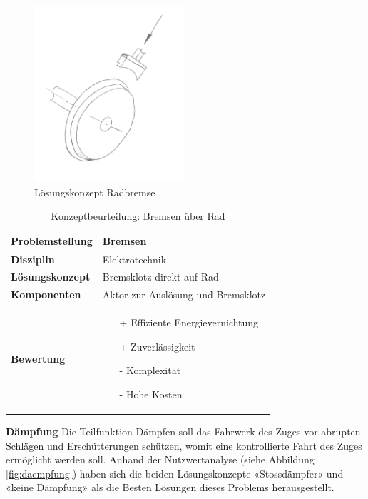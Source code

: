 \documentclass[../../../main.tex]{subfiles}
\begin{document}
    \begin{figure}[H] %
        \centering
        \includegraphics[width=0.5\textwidth]{Radbremse}
        \caption{Lösungskonzept Radbremse}
        \label{fig:radbremse}
    \end{figure}

\begin{flushleft}
    \begin{table}[h]
    \begin{tabular}{ | l | p{11cm} |}
    \hline
    \textbf{Problemstellung} & Bremsen \\ \hline
    \textbf{Disziplin} & Elektrotechnik \\ \hline
    \textbf{Lösungskonzept} & Bremsklotz direkt auf Rad \\ \hline
    \textbf{Komponenten} & Aktor zur Auslösung und Bremsklotz \\ \hline
    \textbf{Bewertung} &  \begin{itemize}
                            \item[+] Effiziente Energievernichtung
                            \item[+] Zuverlässigkeit
                            \item[-] Komplexität 
                            \item[-] Hohe Kosten
                          \end{itemize} \\ \hline
    \end{tabular}
    \caption{Konzeptbeurteilung: Bremsen über Rad}
    \label{tab:radbremse}
\end{table}
\end{flushleft}

  \textbf{Dämpfung}
  Die Teilfunktion Dämpfen soll das Fahrwerk des Zuges vor abrupten Schlägen und Erschütterungen schützen, womit eine kontrollierte Fahrt des Zuges ermöglicht werden soll. Anhand der Nutzwertanalyse (siehe Abbildung \ref{fig:daempfung}) haben sich die beiden Lösungskonzepte «Stossdämpfer» und «keine Dämpfung» als die Besten Lösungen dieses Problems herausgestellt.
\end{document}
